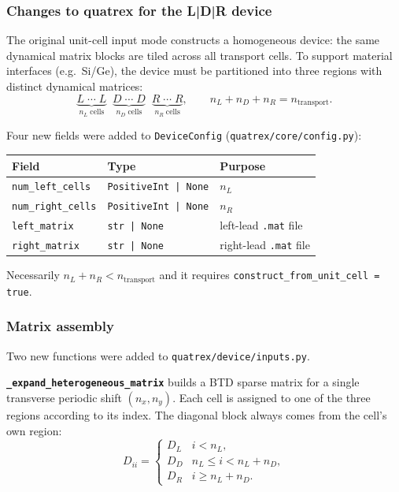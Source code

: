 \subsubsection{Changes to quatrex for the L|D|R device}

The original unit-cell input mode constructs a homogeneous device: the
same dynamical matrix blocks are tiled across all transport cells.  To
support material interfaces (e.g.\ Si/Ge), the device must be
partitioned into three regions with distinct dynamical matrices:
\begin{equation}\label{eq:ldr}
  \underbrace{L \;\cdots\; L}_{n_L\;\text{cells}}
  \;\;\underbrace{D \;\cdots\; D}_{n_D\;\text{cells}}
  \;\;\underbrace{R \;\cdots\; R}_{n_R\;\text{cells}},
  \qquad n_L + n_D + n_R = n_\text{transport}.
\end{equation}

Four new fields were added to \texttt{DeviceConfig}
(\texttt{quatrex/core/config.py}):

\begin{center}
\begin{tabular}{lll}
  \toprule
  Field & Type & Purpose \\
  \midrule
  \texttt{num\_left\_cells}  & \texttt{PositiveInt | None} & $n_L$ \\
  \texttt{num\_right\_cells} & \texttt{PositiveInt | None} & $n_R$ \\
  \texttt{left\_matrix}      & \texttt{str | None} & left-lead \texttt{.mat} file \\
  \texttt{right\_matrix}     & \texttt{str | None} & right-lead \texttt{.mat} file \\
  \bottomrule
\end{tabular}
\end{center}

Necessarily $n_L + n_R < n_\text{transport}$ and it requires \texttt{construct\_from\_unit\_cell = true}.

\subsubsection{Matrix assembly}

Two new functions were added to \texttt{quatrex/device/inputs.py}.

\textbf{\texttt{\_expand\_heterogeneous\_matrix}} builds a BTD sparse
matrix for a single transverse periodic shift $(n_x, n_y)$.  Each
cell is assigned to one of the three regions according to its index.
The diagonal block always comes from the cell's own region:
\begin{equation}
  D_{ii} =
  \begin{cases}
    D_L & i < n_L, \\
    D_D & n_L \le i < n_L + n_D, \\
    D_R & i \ge n_L + n_D.
  \end{cases}
\end{equation}

